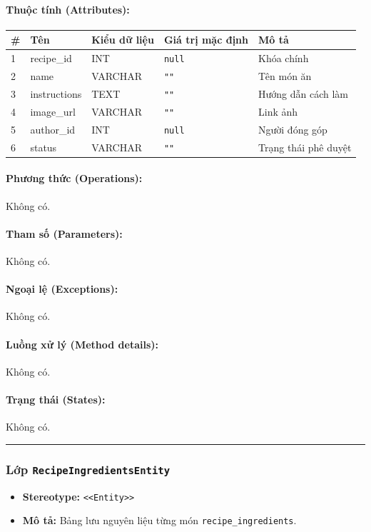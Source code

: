 \documentclass[12pt,a4paper]{article}
\begin{document}
\paragraph{Thuộc tính (Attributes):}
\begin{longtable}{|p{0.6cm}|p{2.8cm}|p{2.2cm}|p{1.8cm}|p{5.8cm}|}
\hline
\textbf{\#} & \textbf{Tên} & \textbf{Kiểu dữ liệu} & \textbf{Giá trị mặc định} & \textbf{Mô tả} \\ \hline
\endhead
1 & recipe\_id & INT & \texttt{null} & Khóa chính \\ \hline
2 & name & VARCHAR & \texttt{""} & Tên món ăn \\ \hline
3 & instructions & TEXT & \texttt{""} & Hướng dẫn cách làm \\ \hline
4 & image\_url & VARCHAR & \texttt{""} & Link ảnh \\ \hline
5 & author\_id & INT & \texttt{null} & Người đóng góp \\ \hline
6 & status & VARCHAR & \texttt{""} & Trạng thái phê duyệt \\ \hline
\end{longtable}

\paragraph{Phương thức (Operations):}
Không có.

\paragraph{Tham số (Parameters):}
Không có.

\paragraph{Ngoại lệ (Exceptions):}
Không có.

\paragraph{Luồng xử lý (Method details):}
Không có.

\paragraph{Trạng thái (States):}
Không có.

\vskip 0.5cm
\noindent\rule{\textwidth}{0.5pt}
\vskip 0.5cm

\subsubsection{Lớp \texttt{RecipeIngredientsEntity}}
\begin{itemize}[leftmargin=*]
    \item \textbf{Stereotype:} \texttt{\textless{}\textless{}Entity\textgreater{}\textgreater{}}
    \item \textbf{Mô tả:} Bảng lưu nguyên liệu từng món \texttt{recipe\_ingredients}.
\end{itemize}
\end{document}
